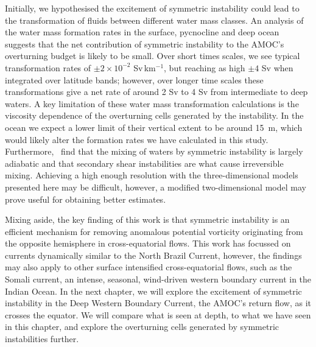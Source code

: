 Initially, we hypothesised the excitement of symmetric instability could lead to the transformation of fluids between different water mass classes. An analysis of the water mass formation rates in the surface, pycnocline and deep ocean suggests that the net contribution of symmetric instability to the AMOC's overturning budget is likely to be small. Over short times scales, we see typical transformation rates of $\pm 2 \times 10^{-2}$ Sv\,km$^{-1}$, but reaching as high $\pm 4$ Sv when integrated over latitude bands; however, over longer time scales these transformations give a net rate of around 2 Sv to 4 Sv from intermediate to deep waters. A key limitation of these water mass transformation calculations is the viscosity dependence of the overturning cells generated by the instability. In the ocean we expect a lower limit of their vertical extent to be around 15~m, which would likely alter the formation rates we have calculated in this study. Furthermore,~\citet{Yankovsky2019} find that the mixing of waters by symmetric instability is largely adiabatic and that secondary shear instabilities are what cause irreversible mixing. Achieving a high enough resolution with the three-dimensional models presented here may be difficult, however, a modified two-dimensional model may prove useful for obtaining better estimates.

Mixing aside, the key finding of this work is that symmetric instability is an efficient mechanism for removing anomalous potential vorticity originating from the opposite hemisphere in cross-equatorial flows. This work has focussed on currents dynamically similar to the North Brazil Current, however, the findings may also apply to other surface intensified cross-equatorial flows, such as the Somali current, an intense, seasonal, wind-driven western boundary current in the Indian Ocean. In the next chapter, we will explore the excitement of symmetric instability in the Deep Western Boundary Current, the AMOC's return flow, as it crosses the equator. We will compare what is seen at depth, to what we have seen in this chapter, and explore the overturning cells generated by symmetric instabilities further.